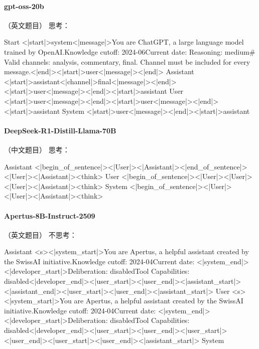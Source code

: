 \paragraph{gpt-oss-20b} （英文题目）
\noindent 思考：
\begin{Rendering}
Start      <|start|>system<|message|>You are ChatGPT, a large language model trained by OpenAI.\NL{}Knowledge cutoff: 2024-06\NL{}Current date: \NL{}\NL{}Reasoning: medium\NL{}\NL{}# Valid channels: analysis, commentary, final. Channel must be included for every message.<|end|><|start|>user<|message|><|end|>
Assistant  <|start|>assistant<|channel|>final<|message|><|end|><|start|>user<|message|><|end|><|start|>assistant
User       <|start|>user<|message|><|end|><|start|>user<|message|><|end|><|start|>assistant
System      <|start|>user<|message|><|end|><|start|>assistant
\end{Rendering}
\paragraph{DeepSeek-R1-Distill-Llama-70B} （中文题目）
\noindent 思考：
\begin{Rendering}
Assistant  <|begin_of_sentence|><|User|><|Assistant|><|end_of_sentence|><|User|><|Assistant|><think>\NL{}
User       <|begin_of_sentence|><|User|><|User|><|User|><|Assistant|><think>\NL{}
System      <|begin_of_sentence|><|User|><|User|><|Assistant|><think>\NL{}
\end{Rendering}
\paragraph{Apertus-8B-Instruct-2509} （英文题目）
\noindent 不思考：
\begin{Rendering}
Assistant  <s><|system_start|>You are Apertus, a helpful assistant created by the SwissAI initiative.\NL{}Knowledge cutoff: 2024-04\NL{}Current date: <|system_end|><|developer_start|>Deliberation: disabled\NL{}Tool Capabilities: disabled<|developer_end|><|user_start|><|user_end|><|assistant_start|><|assistant_end|><|user_start|><|user_end|><|assistant_start|>
User       <s><|system_start|>You are Apertus, a helpful assistant created by the SwissAI initiative.\NL{}Knowledge cutoff: 2024-04\NL{}Current date: <|system_end|><|developer_start|>Deliberation: disabled\NL{}Tool Capabilities: disabled<|developer_end|><|user_start|><|user_end|><|user_start|><|user_end|><|user_start|><|user_end|><|assistant_start|>
System     
\end{Rendering}

